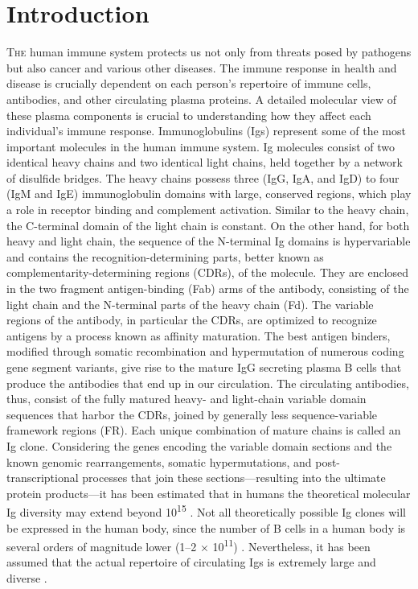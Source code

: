 \section{Introduction}
\lettrine[lraise=0.1, nindent=0em, slope=-.5em]{T}{he}
human immune system protects us not only from threats posed by pathogens but also cancer and various other diseases. The immune response in health and disease is crucially dependent on each person’s repertoire of immune cells, antibodies, and other circulating plasma proteins. A detailed molecular view of these plasma components is crucial to understanding how they affect each individual’s immune response. Immunoglobulins (Igs) represent some of the most important molecules in the human immune system. Ig molecules consist of two identical heavy chains and two identical light chains, held together by a network of disulfide bridges. The heavy chains possess three (IgG, IgA, and IgD) to four (IgM and IgE) immunoglobulin domains with large, conserved regions, which play a role in receptor binding and complement activation. Similar to the heavy chain, the C-terminal domain of the light chain is constant. On the other hand, for both heavy and light chain, the sequence of the N-terminal Ig domains is hypervariable and contains the recognition-determining parts, better known as complementarity-determining regions (CDRs), of the molecule. They are enclosed in the two fragment antigen-binding (Fab) arms of the antibody, consisting of the light chain and the N-terminal parts of the heavy chain (Fd).
The variable regions of the antibody, in particular the CDRs, are optimized to recognize antigens by a process known as affinity maturation. The best antigen binders, modified through somatic recombination and hypermutation of numerous coding gene segment variants, give rise to the mature IgG secreting plasma B cells that produce the antibodies that end up in our circulation. The circulating antibodies, thus, consist of the fully matured heavy- and light-chain variable domain sequences that harbor the CDRs, joined by generally less sequence-variable framework regions (FR). Each unique combination of mature chains is called an Ig clone.
Considering the genes encoding the variable domain sections and the known genomic rearrangements, somatic hypermutations, and post-transcriptional processes that join these sections—resulting into the ultimate protein products—it has been estimated that in humans the theoretical molecular Ig diversity may extend beyond 10\textsuperscript{15} \cite{schroeder2006similarity}. Not all theoretically possible Ig clones will be expressed in the human body, since the number of B cells in a human body is several orders of magnitude lower (1–2 × 10\textsuperscript{11}) \cite{apostoaei2012review}. Nevertheless, it has been assumed that the actual repertoire of circulating Igs is extremely large and diverse \cite{briney2019commonality, soto2019high}.
